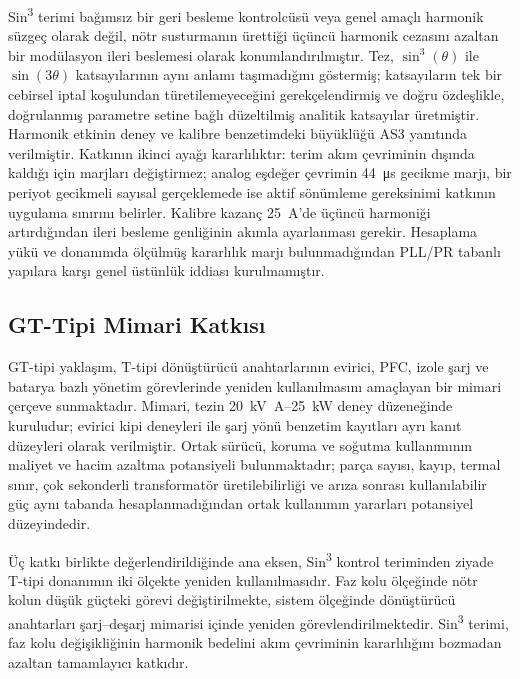 Sin\textsuperscript{3} terimi bağımsız bir geri besleme kontrolcüsü veya genel amaçlı harmonik süzgeç olarak değil, nötr susturmanın ürettiği üçüncü harmonik cezasını azaltan bir modülasyon ileri beslemesi olarak konumlandırılmıştır. Tez, $\sin^3(\theta)$ ile $\sin(3\theta)$ katsayılarının aynı anlamı taşımadığını göstermiş; katsayıların tek bir cebirsel iptal koşulundan türetilemeyeceğini gerekçelendirmiş ve doğru özdeşlikle, doğrulanmış parametre setine bağlı düzeltilmiş analitik katsayılar üretmiştir. Harmonik etkinin deney ve kalibre benzetimdeki büyüklüğü AS3 yanıtında verilmiştir. Katkının ikinci ayağı kararlılıktır: terim akım çevriminin dışında kaldığı için marjları değiştirmez; analog eşdeğer çevrimin \SI{44}{\micro\second} gecikme marjı, bir periyot gecikmeli sayısal gerçeklemede ise aktif sönümleme gereksinimi katkının uygulama sınırını belirler. Kalibre kazanç \SI{25}{\ampere}'de üçüncü harmoniği artırdığından ileri besleme genliğinin akımla ayarlanması gerekir. Hesaplama yükü ve donanımda ölçülmüş kararlılık marjı bulunmadığından PLL/PR tabanlı yapılara karşı genel üstünlük iddiası kurulmamıştır.

\subsection{GT-Tipi Mimari Katkısı}

GT-tipi yaklaşım, T-tipi dönüştürücü anahtarlarının evirici, PFC, izole şarj ve batarya bazlı yönetim görevlerinde yeniden kullanılmasını amaçlayan bir mimari çerçeve sunmaktadır. Mimari, tezin \SI{20}{\kilo\volt\ampere}--\SI{25}{\kilo\watt} deney düzeneğinde kuruludur; evirici kipi deneyleri ile şarj yönü benzetim kayıtları ayrı kanıt düzeyleri olarak verilmiştir. Ortak sürücü, koruma ve soğutma kullanımının maliyet ve hacim azaltma potansiyeli bulunmaktadır; parça sayısı, kayıp, termal sınır, çok sekonderli transformatör üretilebilirliği ve arıza sonrası kullanılabilir güç aynı tabanda hesaplanmadığından ortak kullanımın yararları potansiyel düzeyindedir.

Üç katkı birlikte değerlendirildiğinde ana eksen, Sin\textsuperscript{3} kontrol teriminden ziyade T-tipi donanımın iki ölçekte yeniden kullanılmasıdır. Faz kolu ölçeğinde nötr kolun düşük güçteki görevi değiştirilmekte, sistem ölçeğinde dönüştürücü anahtarları şarj--deşarj mimarisi içinde yeniden görevlendirilmektedir. Sin\textsuperscript{3} terimi, faz kolu değişikliğinin harmonik bedelini akım çevriminin kararlılığını bozmadan azaltan tamamlayıcı katkıdır.

